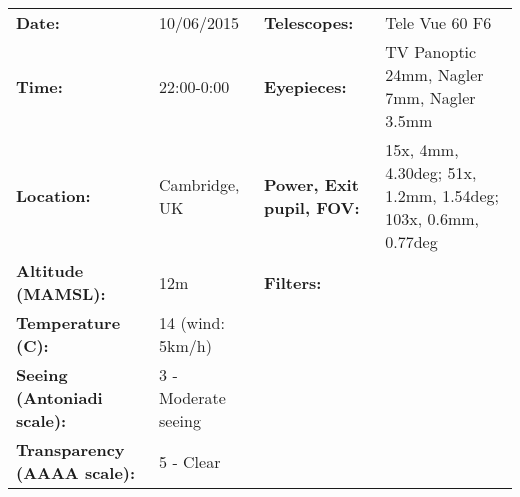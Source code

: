 \begin{tabular}{ p{1.7in} p{1.2in} p{1.5in} p{4.2in}}
{\bf Date:} & 10/06/2015 & {\bf Telescopes:} & Tele Vue 60 F6 \\ 
{\bf Time:} & 22:00-0:00 & {\bf Eyepieces:} & TV Panoptic 24mm, Nagler 7mm, Nagler 3.5mm \\ 
{\bf Location:} & Cambridge, UK & {\bf Power, Exit pupil, FOV:} & 15x, 4mm, 4.30deg; 51x, 1.2mm, 1.54deg; 103x, 0.6mm, 0.77deg \\ 
{\bf Altitude (MAMSL):} & 12m & {\bf Filters:} &  \\ 
{\bf Temperature (C):} & 14 (wind: 5km/h) & & \\ 
{\bf Seeing (Antoniadi scale):} & 3 - Moderate seeing & & \\ 
{\bf Transparency (AAAA scale):} & 5 - Clear & & \\ 
\end{tabular}
\centering 

